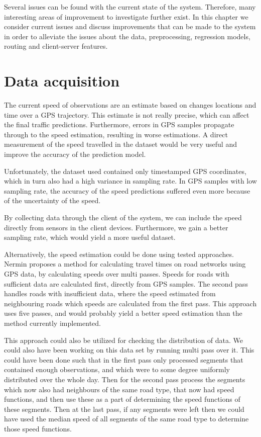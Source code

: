 Several issues can be found with the current state of the system. Therefore, many interesting areas of improvement to investigate further exist. In this chapter we consider current issues and discuss improvements that can be made to the system in order to alleviate the issues about the data, preprocessing, regression models, routing and client-server features.

\section{Data acquisition}
The current speed of observations are an estimate based on changes locations and time over a GPS trajectory. This estimate is not really precise, which can affect the final traffic predictions. Furthermore, errors in GPS samples propagate through to the speed estimation, resulting in worse estimations. A direct measurement of the speed travelled in the dataset would be very useful and improve the accuracy of the prediction model.

Unfortunately, the dataset used contained only timestamped GPS coordinates, which in turn also had a high variance in sampling rate. In GPS samples with low sampling rate, the accuracy of the speed predictions suffered even more because of the uncertainty of the speed.

By collecting data through the client of the system, we can include the speed directly from sensors in the client devices. Furthermore, we gain a better sampling rate, which would yield a more useful dataset.

Alternatively, the speed estimation could be done using tested approaches. Nermin\cite{Mudzelet07} proposes a method for calculating travel times on road networks using GPS data, by calculating speeds over multi passes. Speeds for roads with sufficient data are calculated first, directly from GPS samples. The second pass handles roads with insufficient data, where the speed estimated from neighbouring roads which speeds are calculated from the first pass. This approach uses five passes, and would probably yield a better speed estimation than the method currently implemented.

This approach could also be utilized for checking the distribution of data. We could also have been working on this data set by running multi pass over it. This could have been done such that in the first pass only processed segments that contained enough observations, and which were to some degree uniformly distributed over the whole day. Then for the second pass process the segments which now also had neighbours of the same road type, that now had speed functions, and then use these as a part of determining the speed functions of these segments. Then at the last pass, if any segments were left then we could have used the median speed of all segments of the same road type to determine those speed functions.

